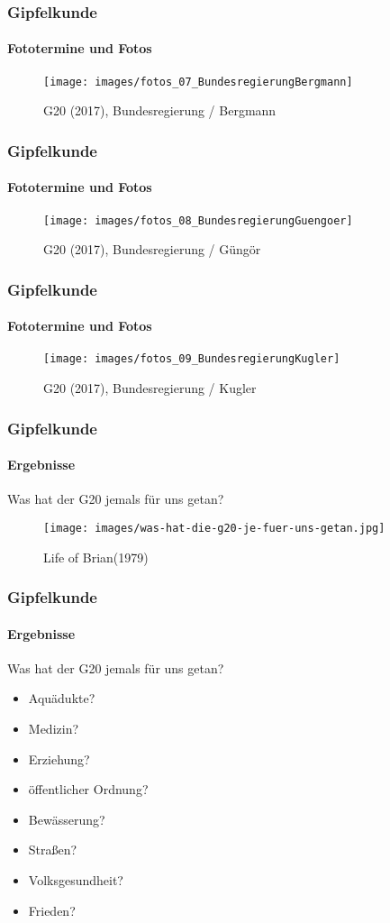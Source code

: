 \documentclass[]{beamer}
\begin{document}
	\begin{frame}
	\frametitle{Gipfelkunde}  \framesubtitle{Fototermine und Fotos}
	\begin{figure}[h!]
		\renewcommand{\figurename}{Foto} 
		\texttt{[image: images/fotos\_07\_BundesregierungBergmann]}
		\caption{G20 (2017), Bundesregierung / Bergmann}
	\end{figure}
	\end{frame}

	\begin{frame}
	\frametitle{Gipfelkunde}  \framesubtitle{Fototermine und Fotos}
	\begin{figure}[h!]
		\renewcommand{\figurename}{Foto} 
		\texttt{[image: images/fotos\_08\_BundesregierungGuengoer]}
		\caption{G20 (2017), Bundesregierung / Güngör}
	\end{figure}
	\end{frame}

	\begin{frame}
	\frametitle{Gipfelkunde}  \framesubtitle{Fototermine und Fotos}
	\begin{figure}[h!]
		\renewcommand{\figurename}{Foto} 
		\texttt{[image: images/fotos\_09\_BundesregierungKugler]}
		\caption{G20 (2017), Bundesregierung / Kugler}
	\end{figure}
	\end{frame}

	\begin{frame}
		\frametitle{Gipfelkunde}  \framesubtitle{Ergebnisse}
		Was hat der G20 jemals für uns getan?
		\begin{figure}[h!]
			\renewcommand{\figurename}{Foto} 
			\texttt{[image: images/was-hat-die-g20-je-fuer-uns-getan.jpg]}
			\caption{Life of Brian(1979)}
		\end{figure}
	\end{frame}

	\begin{frame}
	\frametitle{Gipfelkunde}  \framesubtitle{Ergebnisse}
	Was hat der G20 jemals für uns getan?
	\begin{itemize}
		\item Aquädukte?
		\item Medizin?
		\item Erziehung?
		\item öffentlicher Ordnung?
		\item Bewässerung?
		\item Straßen?
		\item Volksgesundheit?
		\item Frieden?
	\end{itemize}
	\end{frame}
\end{document}
